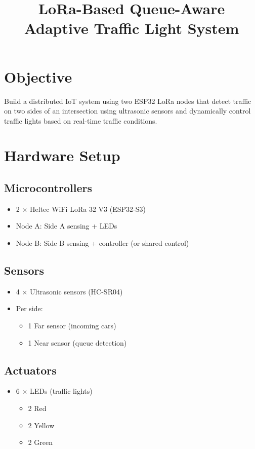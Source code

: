 \documentclass[11pt]{article}
\title{LoRa-Based Queue-Aware Adaptive Traffic Light System}
\author{}
\date{}
\begin{document}
\maketitle

\section{Objective}
Build a distributed IoT system using two ESP32 LoRa nodes that detect traffic on two sides of an intersection using ultrasonic sensors and dynamically control traffic lights based on real-time traffic conditions.

\section{Hardware Setup}

\subsection{Microcontrollers}
\begin{itemize}
    \item 2 $\times$ Heltec WiFi LoRa 32 V3 (ESP32-S3)
    \item Node A: Side A sensing + LEDs
    \item Node B: Side B sensing + controller (or shared control)
\end{itemize}

\subsection{Sensors}
\begin{itemize}
    \item 4 $\times$ Ultrasonic sensors (HC-SR04)
    \item Per side:
    \begin{itemize}
        \item 1 Far sensor (incoming cars)
        \item 1 Near sensor (queue detection)
    \end{itemize}
\end{itemize}

\subsection{Actuators}
\begin{itemize}
    \item 6 $\times$ LEDs (traffic lights)
    \begin{itemize}
        \item 2 Red
        \item 2 Yellow
        \item 2 Green
    \end{itemize}
\end{itemize}
\end{document}
